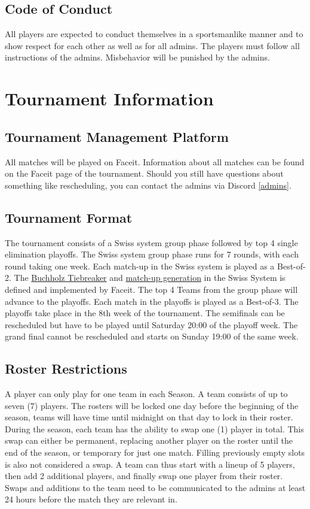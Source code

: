 \documentclass{article}
\begin{document}
\subsection{Code of Conduct}
All players are expected to conduct themselves in a sportsmanlike manner and to show respect for each other
as well as for all admins. The players must follow all instructions of the admins. Misbehavior will be punished by the admins.

\section{Tournament Information}
\subsection{Tournament Management Platform}
All matches will be played on Faceit. Information about all matches can be found on the Faceit page of the tournament. Should 
you still have questions about something like rescheduling, you can contact the admins via Discord \ref{admins}. 

\subsection{Tournament Format}
The tournament consists of a Swiss system group phase followed by top 4 single elimination playoffs. The Swiss system group phase runs for 7 rounds, with each round taking one week. Each match-up in the Swiss system is played as a Best-of-2. The \href{https://support.faceit.com/hc/en-us/articles/360003297299-What-are-tiebreakers-}{Buchholz Tiebreaker} and \href{https://web.archive.org/web/20210410142913/https://support.faceit.com/hc/en-us/articles/360010288440-Swiss-system-tournaments}{match-up generation} in the Swiss System is defined and implemented by Faceit.
The top 4 Teams from the group phase will advance to the playoffs. Each match in the playoffs is played as a Best-of-3. The playoffs take place in the 8th week of the tournament. The semifinals can be rescheduled but have to be played until Saturday 20:00 of the playoff week. The grand final cannot be rescheduled and starts on Sunday 19:00 of the same week.

\subsection{Roster Restrictions}
A player can only play for one team in each Season. 
A team consists of up to seven (7) players. The rosters will be locked one day before the beginning of the season, teams will have time until midnight on that day to lock in their roster. During the season, each team has the ability to swap one (1) player in total. This swap can either be permanent, replacing another player on the roster until the end of the season, or temporary for just one match. Filling previously empty slots is also not considered a swap. A team can thus start with a lineup of 5 players, then add 2 additional players, and finally swap one player from their roster.
Swaps and additions to the team need to be communicated to the admins at least 24 hours before the match they are relevant in.
\end{document}
